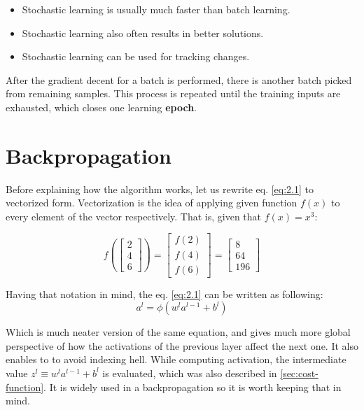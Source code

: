 \begin{itemize}
    \item Stochastic learning is usually much faster than batch learning.
    \item Stochastic learning also often results in better solutions.
    \item Stochastic learning can be used for tracking changes.
\end{itemize}

After the gradient decent for a batch is performed, there is another batch picked from remaining samples. This process is repeated until the training inputs are exhausted, which closes one learning \textbf{epoch}.

\section{Backpropagation}
\label{sec:backpropagation}

Before explaining how the algorithm works, let us rewrite eq. \ref{eq:2.1} to vectorized form. Vectorization is the idea of applying given function $f(x)$ to every element of the vector respectively. That is, given that $f(x) = x^3$:

\begin{equation}
    f\left(\begin{bmatrix}
         2 \\
         4 \\
         6
    \end{bmatrix}
    \right) =
    \begin{bmatrix}
        f(2) \\
        f(4) \\
        f(6)
    \end{bmatrix} = 
    \begin{bmatrix}
        8 \\
        64 \\
        196
    \end{bmatrix}
\end{equation}

Having that notation in mind, the eq. \ref{eq:2.1} can be written as following:
\begin{equation}
    a^l = \phi \left(w^la^{l-1} + b^l \right)
\end{equation}

Which is much neater version of the same equation, and gives much more global perspective of how the activations of the previous layer affect the next one. It also enables to to avoid indexing hell.
While computing activation, the intermediate value $z^l \equiv w^la^{l-1}+b^l$ is evaluated, which was also described in \ref{sec:cost-function}. It is widely used in a backpropagation so it is worth keeping that in mind.

